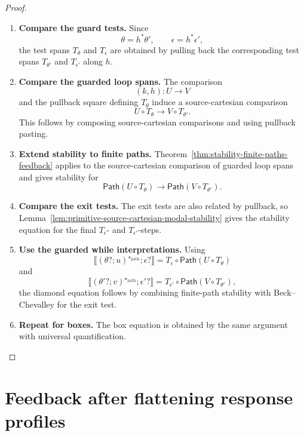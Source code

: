 \begin{proof}
\begin{enumerate}
  \item \textbf{Compare the guard tests.}
  Since
  \[
    \theta=h^\ast\theta',
    \qquad
    \epsilon=h^\ast\epsilon',
  \]
  the test spans \(T_\theta\) and \(T_\epsilon\) are obtained by pulling back
  the corresponding test spans \(T_{\theta'}\) and \(T_{\epsilon'}\) along
  \(h\).

  \item \textbf{Compare the guarded loop spans.}
  The comparison
  \[
    (k,h):U\to V
  \]
  and the pullback square defining \(T_\theta\) induce a source-cartesian
  comparison
  \[
    U\circ T_\theta
    \longrightarrow
    V\circ T_{\theta'}.
  \]
  This follows by composing source-cartesian comparisons and using pullback
  pasting.

  \item \textbf{Extend stability to finite paths.}
  Theorem~\ref{thm:stability-finite-paths-feedback} applies to the
  source-cartesian comparison of guarded loop spans and gives stability for
  \[
    \mathsf{Path}(U\circ T_\theta)
    \longrightarrow
    \mathsf{Path}(V\circ T_{\theta'}).
  \]

  \item \textbf{Compare the exit tests.}
  The exit tests are also related by pullback, so
  Lemma~\ref{lem:primitive-source-cartesian-modal-stability} gives the
  stability equation for the final \(T_\epsilon\)- and
  \(T_{\epsilon'}\)-steps.

  \item \textbf{Use the guarded while interpretations.}
  Using
  \[
    \llbracket
      (\theta?;u)^{\star_{\mathrm{path}}};\epsilon?
    \rrbracket
    =
    T_\epsilon\circ\mathsf{Path}(U\circ T_\theta)
  \]
  and
  \[
    \llbracket
      (\theta'?;v)^{\star_{\mathrm{path}}};\epsilon'?
    \rrbracket
    =
    T_{\epsilon'}\circ\mathsf{Path}(V\circ T_{\theta'}),
  \]
  the diamond equation follows by combining finite-path stability with
  Beck--Chevalley for the exit test.

  \item \textbf{Repeat for boxes.}
  The box equation is obtained by the same argument with universal
  quantification.
\end{enumerate}
\end{proof}

\section{Feedback after flattening response profiles}
\label{sec:feedback-after-flattening-response-profiles}

